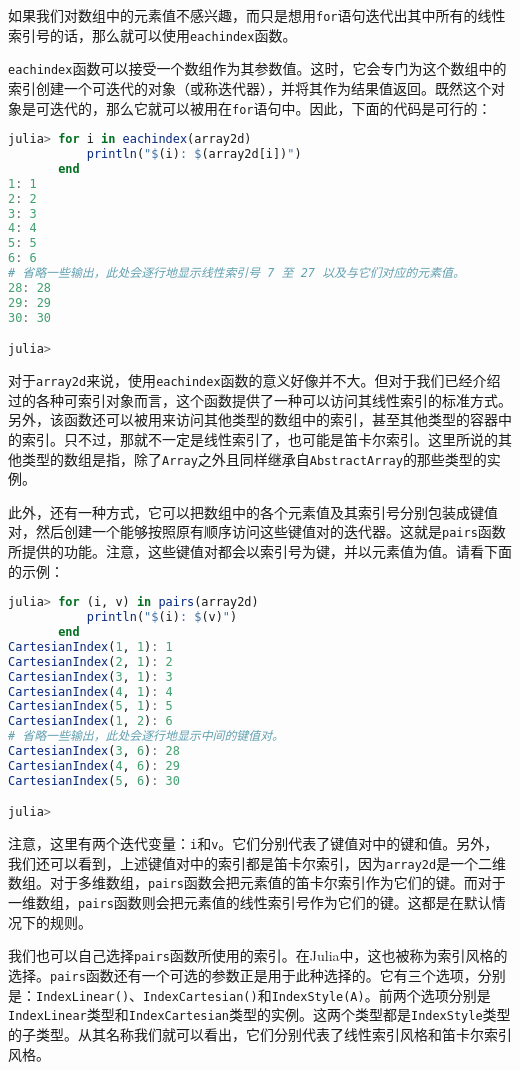 如果我们对数组中的元素值不感兴趣，而只是想用\verb|for|语句迭代出其中所有的线性索引号的话，那么就可以使用\verb|eachindex|函数。

\verb|eachindex|函数可以接受一个数组作为其参数值。这时，它会专门为这个数组中的索引创建一个可迭代的对象（或称迭代器），并将其作为结果值返回。既然这个对象是可迭代的，那么它就可以被用在\verb|for|语句中。因此，下面的代码是可行的：

\begin{lstlisting}[language=julia]
julia> for i in eachindex(array2d)
           println("$(i): $(array2d[i])")
       end
1: 1
2: 2
3: 3
4: 4
5: 5
6: 6
# 省略一些输出，此处会逐行地显示线性索引号 7 至 27 以及与它们对应的元素值。
28: 28
29: 29
30: 30

julia> 
\end{lstlisting}

对于\verb|array2d|来说，使用\verb|eachindex|函数的意义好像并不大。但对于我们已经介绍过的各种可索引对象而言，这个函数提供了一种可以访问其线性索引的标准方式。另外，该函数还可以被用来访问其他类型的数组中的索引，甚至其他类型的容器中的索引。只不过，那就不一定是线性索引了，也可能是笛卡尔索引。这里所说的其他类型的数组是指，除了\verb|Array|之外且同样继承自\verb|AbstractArray|的那些类型的实例。

此外，还有一种方式，它可以把数组中的各个元素值及其索引号分别包装成键值对，然后创建一个能够按照原有顺序访问这些键值对的迭代器。这就是\verb|pairs|函数所提供的功能。注意，这些键值对都会以索引号为键，并以元素值为值。请看下面的示例：

\begin{lstlisting}[language=julia]
julia> for (i, v) in pairs(array2d)
           println("$(i): $(v)")
       end
CartesianIndex(1, 1): 1
CartesianIndex(2, 1): 2
CartesianIndex(3, 1): 3
CartesianIndex(4, 1): 4
CartesianIndex(5, 1): 5
CartesianIndex(1, 2): 6
# 省略一些输出，此处会逐行地显示中间的键值对。
CartesianIndex(3, 6): 28
CartesianIndex(4, 6): 29
CartesianIndex(5, 6): 30

julia> 
\end{lstlisting}

注意，这里有两个迭代变量：\verb|i|和\verb|v|。它们分别代表了键值对中的键和值。另外，我们还可以看到，上述键值对中的索引都是笛卡尔索引，因为\verb|array2d|是一个二维数组。对于多维数组，\verb|pairs|函数会把元素值的笛卡尔索引作为它们的键。而对于一维数组，\verb|pairs|函数则会把元素值的线性索引号作为它们的键。这都是在默认情况下的规则。

我们也可以自己选择\verb|pairs|函数所使用的索引。在Julia中，这也被称为索引风格的选择。\verb|pairs|函数还有一个可选的参数正是用于此种选择的。它有三个选项，分别是：\verb|IndexLinear()|、\verb|IndexCartesian()|和\verb|IndexStyle(A)|。前两个选项分别是\verb|IndexLinear|类型和\verb|IndexCartesian|类型的实例。这两个类型都是\verb|IndexStyle|类型的子类型。从其名称我们就可以看出，它们分别代表了线性索引风格和笛卡尔索引风格。

